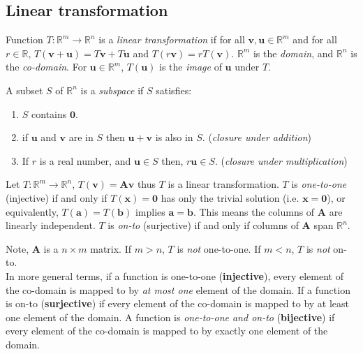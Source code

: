 \subsection{Linear transformation}

\begin{definition}
Function $T:\mathbb{R}^m\rightarrow\mathbb{R}^n$ is a \emph{linear transformation} if for all $\bm{v},\bm{u}\in\mathbb{R}^{m}$ and for all $r\in\mathbb{R}$, $T(\bm{v}+\bm{u})=T\bm{v}+T\bm{u}$ and $T(r\bm{v}) = rT(\bm{v})$.
$\mathbb{R}^m$ is the \emph{domain}, and $\mathbb{R}^n$ is the \emph{co-domain}. For $\bm{u}\in\mathbb{R}^m$, $T(\bm{u})$ is the \emph{image} of $\bm{u}$ under $T$.
\end{definition}

\begin{definition}[Subspace]
A subset $S$ of $\mathbb{R}^n$ is a \emph{subspace} if $S$ satisfies:
\begin{enumerate}[label=\alph*)]
    \item $S$ contains $\bm{0}$.
    \item if $\bm{u}$ and $\bm{v}$ are in $S$ then $\bm{u}+\bm{v}$ is also in $S$. (\emph{closure under addition})
    \item If $r$ is a real number, and $\bm{u}\in S$ then, $r\bm{u}\in S$. (\emph{closure under multiplication})
\end{enumerate}
\end{definition}

\begin{definition}
 Let $T:\mathbb{R}^m\rightarrow\mathbb{R}^n$, $T(\bm{v})=\bm{A}\bm{v}$ thus $T$ is a linear transformation. $T$ is \emph{one-to-one} (injective) if and only if $T(\bm{x})=\bm{0}$ has only the trivial solution (i.e. $\bm{x}=\bm{0}$), or equivalently, $T(\bm{a})=T(\bm{b})$ implies $\bm{a}=\bm{b}$. This means the columns of $\bm{A}$ are linearly independent. $T$ is \emph{on-to} (surjective) if and only if columns of $\bm{A}$ span $\mathbb{R}^n$.
\end{definition}

Note, $\bm{A}$ is a $n\times m$ matrix.
If $m>n$, $T$ is \emph{not} one-to-one.
If $m<n$, $T$ is \emph{not} on-to.\\

In more general terms, if a function is one-to-one (\textbf{injective}), every element of the co-domain is mapped to by \textit{at most one} element of the domain. If a function is on-to (\textbf{surjective}) if every element of the co-domain is mapped to by at least one element of the domain. A function is \emph{one-to-one and on-to} (\textbf{bijective}) if every element of the co-domain is mapped to by exactly one element of the domain.
